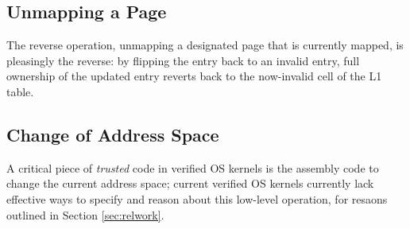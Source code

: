 
\subsection{Unmapping a Page}
The reverse operation, unmapping a designated page that is currently mapped, is pleasingly the reverse: by flipping the entry back to an invalid entry, full ownership of the updated entry reverts back to the now-invalid cell of the L1 table.

\subsection{Change of Address Space}
A critical piece of \emph{trusted} code in verified OS kernels is the assembly code to change the current address space; current verified OS kernels currently lack effective ways to specify and reason about this low-level operation, for resaons outlined in Section \ref{sec:relwork}.



